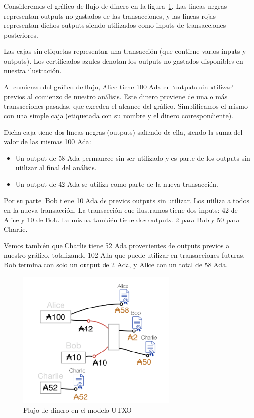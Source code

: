\documentclass[12pt]{book}
\begin{document}
Consideremos el gráfico de flujo de dinero en la figura~\ref{fig:UTXO_Funds_Flow_Example}. Las lineas negras representan outputs no gastados de las transacciones, y las lineas rojas representan dichos outputs siendo utilizados como inputs de transacciones posteriores.

Las cajas sin etiquetas representan una transacción (que contiene varios inputs y outputs). Los certificados azules denotan los outputs no gastados disponibles en nuestra ilustración.

Al comienzo del gráfico de flujo, Alice tiene 100 Ada en `outputs sin utilizar' previos al comienzo de nuestro análisis. Este dinero proviene de una o más transacciones pasadas, que exceden el alcance del gráfico. Simplificamos el mismo con una simple caja (etiquetada con su nombre y el dinero correspondiente).

Dicha caja tiene dos lineas negras (outputs) saliendo de ella, siendo la suma del valor de las mismas 100 Ada:

\begin{itemize}
    \item Un output de 58 Ada permanece sin ser utilizado y es parte de los outputs sin utilizar al final del análisis.
    \item Un output de 42 Ada se utiliza como parte de la nueva transacción.
\end{itemize}

Por su parte, Bob tiene 10 Ada de previos outputs sin utilizar. Los utiliza a todos en la nueva transacción. La transacción que ilustramos tiene dos inputs: 42 de Alice y 10 de Bob. La misma también tiene dos outputs: 2 para Bob y 50 para Charlie.

Vemos también que Charlie tiene 52 Ada provenientes de outputs previos a nuestro gráfico, totalizando 102 Ada que puede utilizar en transacciones futuras. Bob termina con solo un output de 2 Ada, y Alice con un total de 58 Ada.

\begin{figure}
    \centering
    \includegraphics[width=0.7\textwidth]{UTXO_Funds_Flow_Example.png}
    \caption{Flujo de dinero en el modelo UTXO}\label{fig:UTXO_Funds_Flow_Example}
\end{figure}
\end{document}
